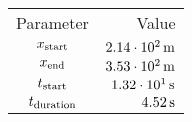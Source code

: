 \begin{tabular}{cr}
    \toprule
    Parameter & Value \\ \otoprule
    $x_{\textup{start}}$    & $\unit[2.14 \cdot 10^{2}]{m}$ \\
    $x_{\textup{end}}$      & $\unit[3.53 \cdot 10^{2}]{m}$ \\
    $t_{\textup{start}}$    & $\unit[1.32 \cdot 10^{1}]{s}$ \\
    $t_{\textup{duration}}$ & $\unit[4.52]{s}$ \\
    \bottomrule
\end{tabular}
